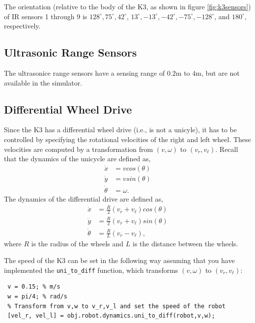 \documentclass[10pt]{article}
\begin{document}
The orientation (relative to the body of the K3, as shown in figure \ref{fig:k3sensors}) of IR sensors 1 through 9 is $128^\circ, 75^\circ, 42^\circ$, $13^\circ, -13^\circ, -42^\circ, -75^\circ, -128^\circ$, and $180^\circ$, respectively.

\subsection*{Ultrasonic Range Sensors}
The ultrasonice range sensors have a sensing range of $0.2$m to $4$m, but are not available in the simulator.

\subsection*{Differential Wheel Drive}
Since the K3 has a differential wheel drive (i.e., is not a unicyle), it has to be controlled by specifying the rotational velocities of the right and left wheel. These velocities are computed by a transformation from $(v,\omega)$ to $(v_r,v_\ell)$. Recall that the dynamics of the unicycle are defined as,
\begin{equation}
 \begin{split}
   \dot{x} &= vcos(\theta) \\
   \dot{y} &= vsin(\theta) \\
   \dot{\theta} &= \omega.
 \end{split}
\end{equation}
The dynamics of the differential drive are defined as,
\begin{equation}
 \begin{split}
  \dot{x} &= \frac{R}{2}(v_r+v_\ell)cos(\theta) \\
  \dot{y} &= \frac{R}{2}(v_r+v_\ell)sin(\theta) \\
  \dot{\theta} &= \frac{R}{L}(v_r-v_\ell),
 \end{split}
\end{equation}
where $R$ is the radius of the wheels and $L$ is the distance between the wheels.

The speed of the K3 can be set in the following way assuming that you have implemented the \texttt{uni\_to\_diff} function, which transforms $(v,\omega)$ to $(v_r,v_\ell)$:
\begin{verbatim}
 v = 0.15; % m/s
 w = pi/4; % rad/s
 % Transform from v,w to v_r,v_l and set the speed of the robot
 [vel_r, vel_l] = obj.robot.dynamics.uni_to_diff(robot,v,w);
\end{verbatim}
\end{document}
